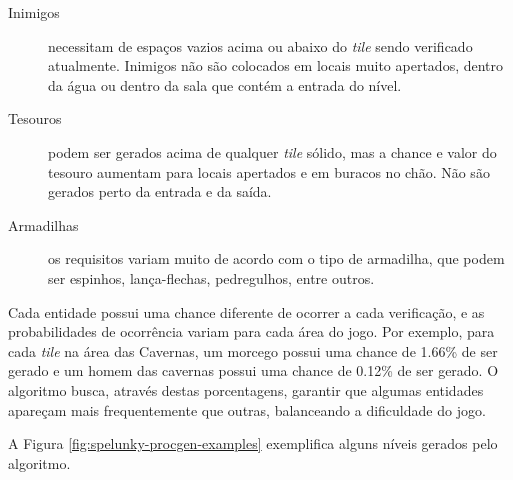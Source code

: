 \begin{description}
	\item[Inimigos]
	necessitam de espaços vazios acima ou abaixo do \textit{tile} sendo
	verificado atualmente. Inimigos não são colocados em locais muito apertados,
	dentro da água ou dentro da sala que contém a entrada do nível.

	\item[Tesouros]
	podem ser gerados acima de qualquer \textit{tile} sólido, mas a chance e
	valor do tesouro aumentam para locais apertados e em buracos no chão. Não
	são gerados perto da entrada e da saída.

	\item[Armadilhas]
	os requisitos variam muito de acordo com o tipo de armadilha, que podem ser
	espinhos, lança-flechas, pedregulhos, entre outros.
\end{description}

Cada entidade possui uma chance diferente de ocorrer a cada verificação, e as
probabilidades de ocorrência variam para cada área do jogo. Por exemplo, para
cada \textit{tile} na área das Cavernas, um morcego possui uma chance de 1.66\%
de ser gerado e um homem das cavernas possui uma chance de 0.12\% de ser gerado.
O algoritmo busca, através destas porcentagens, garantir que algumas entidades
apareçam mais frequentemente que outras, balanceando a dificuldade do jogo.

A Figura \ref{fig:spelunky-procgen-examples} exemplifica alguns níveis gerados
pelo algoritmo.

